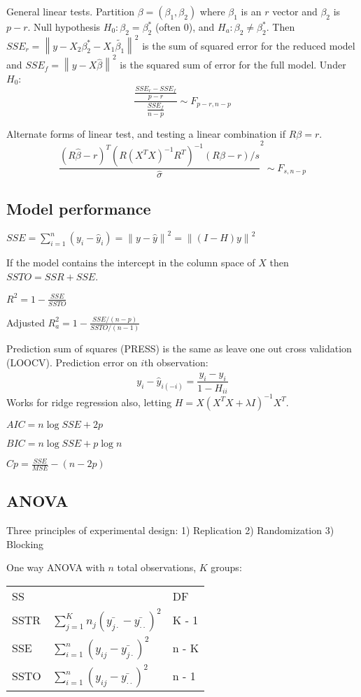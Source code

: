 \documentclass[10pt, twocolumn]{article}
\newcommand{\norm}[1]{\left\lVert#1\right\rVert}
\begin{document}
General linear tests. Partition $\beta = (\beta_1, \beta_2)$ where $\beta_1$
is an $r$ vector and $\beta_2$ is $p - r$. Null hypothesis $H_0: \beta_2 =
\beta_2^*$ (often 0), and $H_a: \beta_2 \neq \beta_2^*$. Then
$SSE_r = \norm{y - X_2 \beta_2^* - X_1 \tilde{\beta_1}}^2$ is the sum of
squared error for the reduced model and 
$SSE_f = \norm{y - X \hat{\beta}}^2$ is the squared sum of error for the
full model.
Under $H_0$:
\[
    \frac{\frac{SSE_r - SSE_f}{p - r}}
         {\frac{SSE_f}{n - p}}
         \sim F_{p-r, n-p}
\]

Alternate forms of linear test, and testing a linear combination if $R\beta
= r$.
\[
    \frac{(R \hat{\beta} - r)^T (R(X^T X)^{-1} R^T)^{-1} (R \beta - r) / s}
    {\hat{\sigma}}^2 \sim F_{s, n-p}
\]

\subsection{Model performance}

$SSE = \sum_{i=1}^n (y_i - \hat{y}_i) = \norm{y - \hat{y}}^2
        = \norm{(I - H)y}^2$

If the model contains the intercept in the column space of $X$  then $SSTO = SSR + SSE$.

$R^2 = 1 - \frac{SSE}{SSTO}$

Adjusted $R^2_a = 1 - \frac{SSE / (n-p)}{SSTO / (n-1)}$

Prediction sum of squares (PRESS) is the same as leave one out cross
validation (LOOCV). Prediction error on $i$th observation:
\[
    y_i - \hat{y}_{i (-i)} = \frac{y_i - \hat{y}_i}{1 - H_{ii}}
\]
Works for ridge regression also, letting 
$H = X(X^T X + \lambda I)^{-1} X^T$.

$AIC = n \log SSE + 2p$

$BIC = n \log SSE + p \log n$

$Cp = \frac{SSE}{MSE} - (n - 2p)$

\subsection{ANOVA}

Three principles of experimental design: 1) Replication 2) Randomization 3)
Blocking

One way ANOVA with $n$ total observations, $K$ groups:

{
\centering
\begin{tabular}{lll}
    SS   &  & DF     \\
    SSTR & $\sum_{j=1}^K n_j (\bar{y_{j \cdot}} - \bar{y_{\cdot \cdot}})^2$  & K - 1 \\
    SSE  & $\sum_{i=1}^n (y_{ij} - \bar{y_{j \cdot}})^2$  & n - K \\
    SSTO & $\sum_{i=1}^n (y_{ij} - \bar{y_{\cdot \cdot}})^2$  & n - 1 
\end{tabular}
}
\end{document}
